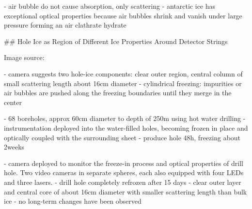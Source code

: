 - air bubble do not cause absorption, only scattering \cite{absorption1997}
- antarctic ice has exceptional optical properties because air bubbles shrink and vanish under large pressure forming an air clathrate hydrate \cite{rongenswedishcamera}

## Hole Ice as Region of Different Ice Properties Around Detector Strings

 Image source: \cite{icrc17pocam}

- camera suggests two hole-ice components: clear outer region, central column of small scattering length about 16cm diameter \cite{rongenswedishcamera,instrumentation}
- cylindrical freezing: impurities or air bubbles are pushed along the freezing boundaries until they merge in the center \cite{rongenswedishcamera}

- 68 boreholes, approx 60cm diameter to depth of 250m using hot water drilling\cite{instrumentation}
- instrumentation deployed into the water-filled holes, becoming frozen in place and optically coupled with the surrounding sheet \cite{instrumentation}
- produce hole 48h, freezing about 2weeks \cite{instrumentation}

- camera deployed to monitor the freeze-in process and optical properties of drill hole. Two video cameras in separate spheres, each also equipped with four LEDs and three lasers. \cite{instrumentation}
- drill hole completely refrozen after 15 days \cite{instrumentation}
- clear outer layer and central core of about 16cm diameter with smaller scattering length than bulk ice\cite{instrumentation}
- no long-term changes have been observed \cite{instrumentation}

